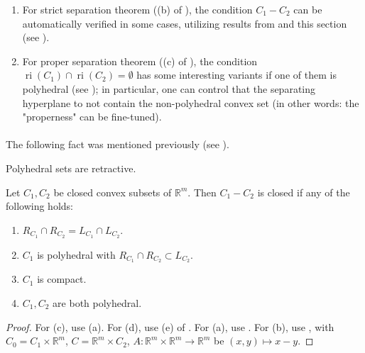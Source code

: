 \begin{enumerate}[label=(\arabic*)]
	\item For strict separation theorem ((b) of ), the condition $C_1-C_2$ can be automatically verified in some cases, utilizing results from  and this section (see ).
	\item For proper separation theorem ((c) of ), the condition $\operatorname{ri}(C_1)\cap\operatorname{ri}(C_2)=\emptyset$ has some interesting variants if one of them is polyhedral (see ); in particular, one can control that the separating hyperplane to not contain the non-polyhedral convex set (in other words: the "properness" can be fine-tuned).
\end{enumerate}

\paragraph{}The following fact was mentioned previously (see ).
\begin{lemm}\label{lemm:017-polyhedral-retractive}
	Polyhedral sets are retractive.
\end{lemm}

\begin{prop}\label{prop:017-closedness-vec-diff}
	Let $C_1,C_2$ be closed convex subsets of $\mathbb{R}^m$. Then $C_1-C_2$ is closed if any of the following holds:
	\begin{enumerate}[label=(\alph*)]
		\item $R_{C_1}\cap R_{C_2}=L_{C_1}\cap L_{C_2}$.
		\item $C_1$ is polyhedral with $R_{C_1}\cap R_{C_2}\subset L_{C_2}$.
		\item $C_1$ is compact.
		\item $C_1,C_2$ are both polyhedral.
	\end{enumerate}
\end{prop}

\begin{proof}
	For (c), use (a). For (d), use (e) of . For (a), use . For (b), use ,  with $C_0=C_1\times \mathbb{R}^{m}$, $C=\mathbb{R}^m\times C_2$, $A:\mathbb{R}^{m}\times \mathbb{R}^m\to \mathbb{R}^m$ be $(x,y)\mapsto x-y$.
\end{proof}


